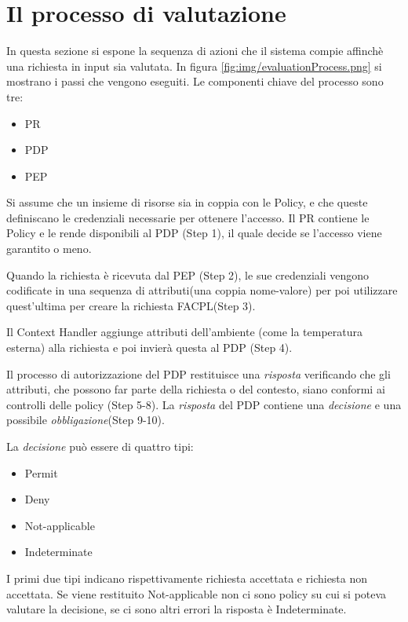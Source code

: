 \section{Il processo di valutazione}
\label{sec:Il processo di valutazione}
In questa sezione si espone la sequenza di azioni che il sistema compie affinchè una richiesta in input sia valutata.
In figura \ref{fig:img/evaluationProcess.png} si mostrano i passi che vengono eseguiti.
Le componenti chiave del processo sono tre:
\begin{itemize}
  \renewcommand\labelitemi{--}
  \item \ac{PR}
  \item \ac{PDP}
  \item \ac{PEP}
\end{itemize}
Si assume che un insieme di risorse sia in coppia con le Policy, e che queste definiscano le credenziali
necessarie per ottenere l'accesso. Il \ac{PR} contiene le Policy e le rende disponibili al \ac{PDP} (Step 1), il
quale decide se l'accesso viene garantito o meno. \par
Quando la richiesta è ricevuta dal \ac{PEP} (Step 2), le sue credenziali vengono codificate in una sequenza
di attributi(una coppia nome-valore) per poi utilizzare quest'ultima per creare la richiesta \ac{FACPL}(Step 3).\par
Il Context Handler aggiunge attributi dell'ambiente (come la temperatura esterna) alla richiesta e
poi invierà questa al \ac{PDP} (Step 4).\par
Il processo di autorizzazione del \ac{PDP} restituisce una \emph{risposta} verificando che gli attributi, che possono far
parte della richiesta o del contesto, siano conformi ai controlli delle policy (Step 5-8). La \emph{risposta} del \ac{PDP}
contiene una \emph{decisione} e una possibile \emph{obbligazione}(Step 9-10).\par
La \emph{decisione} può essere di quattro tipi:
\begin{itemize}
  \renewcommand\labelitemi{--}
  \item Permit
  \item Deny
  \item Not-applicable
  \item Indeterminate
\end{itemize}
I primi due tipi indicano rispettivamente richiesta accettata e richiesta non accettata. Se viene restituito Not-applicable
non ci sono policy su cui si poteva valutare la decisione, se ci sono altri errori la risposta è Indeterminate.
